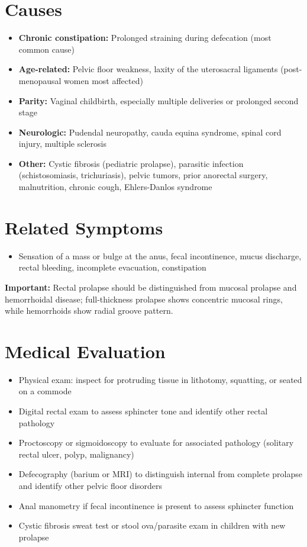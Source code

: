 \section*{Causes}
\begin{itemize}
  \item \textbf{Chronic constipation:} Prolonged straining during defecation (most common cause)
  \item \textbf{Age-related:} Pelvic floor weakness, laxity of the uterosacral ligaments (post-menopausal women most affected)
  \item \textbf{Parity:} Vaginal childbirth, especially multiple deliveries or prolonged second stage
  \item \textbf{Neurologic:} Pudendal neuropathy, cauda equina syndrome, spinal cord injury, multiple sclerosis
  \item \textbf{Other:} Cystic fibrosis (pediatric prolapse), parasitic infection (schistosomiasis, trichuriasis), pelvic tumors, prior anorectal surgery, malnutrition, chronic cough, Ehlers-Danlos syndrome
\end{itemize}

\section*{Related Symptoms}
\begin{itemize}
  \item Sensation of a mass or bulge at the anus, fecal incontinence, mucus discharge, rectal bleeding, incomplete evacuation, constipation
\end{itemize}
\textbf{Important:} Rectal prolapse should be distinguished from mucosal prolapse and hemorrhoidal disease; full-thickness prolapse shows concentric mucosal rings, while hemorrhoids show radial groove pattern.

\section*{Medical Evaluation}
\begin{itemize}
  \item Physical exam: inspect for protruding tissue in lithotomy, squatting, or seated on a commode
  \item Digital rectal exam to assess sphincter tone and identify other rectal pathology
  \item Proctoscopy or sigmoidoscopy to evaluate for associated pathology (solitary rectal ulcer, polyp, malignancy)
  \item Defecography (barium or MRI) to distinguish internal from complete prolapse and identify other pelvic floor disorders
  \item Anal manometry if fecal incontinence is present to assess sphincter function
  \item Cystic fibrosis sweat test or stool ova/parasite exam in children with new prolapse
\end{itemize}

